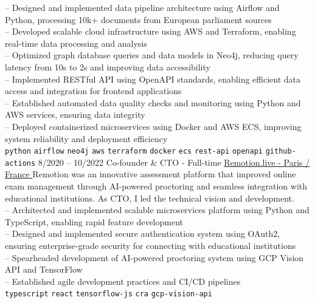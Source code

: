 \begin{entrylist}
{        -- Designed and implemented data pipeline architecture using Airflow and Python, processing 10k+ documents from European parliament sources \\
        -- Developed scalable cloud infrastructure using AWS and Terraform, enabling real-time data processing and analysis \\
        -- Optimized graph database queries and data models in Neo4j, reducing query latency from 10s to 2s and improving data accessibility \\
        -- Implemented RESTful API using OpenAPI standards, enabling efficient data access and integration for frontend applications \\
        -- Established automated data quality checks and monitoring using Python and AWS services, ensuring data integrity \\
        -- Deployed containerized microservices using Docker and AWS ECS, improving system reliability and deployment efficiency \\
        \texttt{python}\slashsep
        \texttt{airflow}\slashsep
        \texttt{neo4j}\slashsep
        \texttt{aws}\slashsep
        \texttt{terraform}\slashsep
        \texttt{docker}\slashsep
        \texttt{ecs}\slashsep
        \texttt{rest-api}\slashsep
        \texttt{openapi}\slashsep
        \texttt{github-actions}\slashsep
    }
    \entry
    {8/2020 -- 10/2022}
    {Co-founder \& CTO - Full-time}
    {\href{https://remotion.live/}{Remotion.live - Paris / France }}
    {Remotion was an innovative assessment platform that improved online exam management through AI-powered proctoring and seamless integration with educational institutions. As CTO, I led the technical vision and development.\\
        -- Architected and implemented scalable microservices platform using Python and TypeScript, enabling rapid feature development \\
        -- Designed and implemented secure authentication system using OAuth2, ensuring enterprise-grade security for connecting with educational institutions \\
        -- Spearheaded development of AI-powered proctoring system using GCP Vision API and TensorFlow \\
        -- Established agile development practices and CI/CD pipelines\\
        \texttt{typescript}\slashsep
        \texttt{react}\slashsep
        \texttt{tensorflow-js}\slashsep
        \texttt{cra}\slashsep
        \texttt{gcp-vision-api}\slashsep
}
\end{entrylist}

